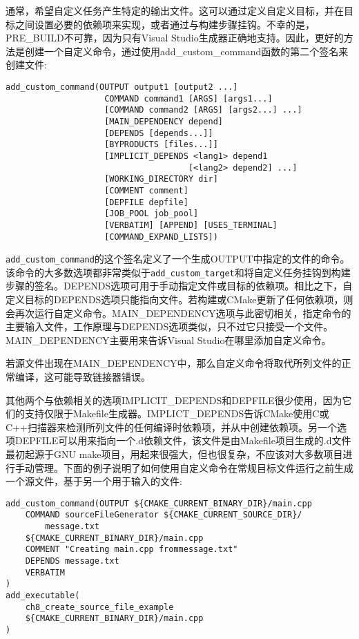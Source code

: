 通常，希望自定义任务产生特定的输出文件。这可以通过定义自定义目标，并在目标之间设置必要的依赖项来实现，或者通过与构建步骤挂钩。不幸的是，PRE\_BUILD不可靠，因为只有Visual Studio生成器正确地支持。因此，更好的方法是创建一个自定义命令，通过使用add\_custom\_command函数的第二个签名来创建文件:

\begin{lstlisting}[style=styleCMake]
add_custom_command(OUTPUT output1 [output2 ...]
					COMMAND command1 [ARGS] [args1...]
					[COMMAND command2 [ARGS] [args2...] ...]
					[MAIN_DEPENDENCY depend]
					[DEPENDS [depends...]]
					[BYPRODUCTS [files...]]
					[IMPLICIT_DEPENDS <lang1> depend1
									 [<lang2> depend2] ...]
					[WORKING_DIRECTORY dir]
					[COMMENT comment]
					[DEPFILE depfile]
					[JOB_POOL job_pool]
					[VERBATIM] [APPEND] [USES_TERMINAL]
					[COMMAND_EXPAND_LISTS])
\end{lstlisting}

\texttt{add\_custom\_command}的这个签名定义了一个生成OUTPUT中指定的文件的命令。该命令的大多数选项都非常类似于\texttt{add\_custom\_target}和将自定义任务挂钩到构建步骤的签名。DEPENDS选项可用于手动指定文件或目标的依赖项。相比之下，自定义目标的DEPENDS选项只能指向文件。若构建或CMake更新了任何依赖项，则会再次运行自定义命令。MAIN\_DEPENDENCY选项与此密切相关，指定命令的主要输入文件，工作原理与DEPENDS选项类似，只不过它只接受一个文件。MAIN\_DEPENDENCY主要用来告诉Visual Studio在哪里添加自定义命令。

\begin{tcolorbox}[colback=webgreen!5!white,colframe=webgreen!75!black,title=Note]
若源文件出现在MAIN\_DEPENDENCY中，那么自定义命令将取代所列文件的正常编译，这可能导致链接器错误。
\end{tcolorbox}

其他两个与依赖相关的选项IMPLICIT\_DEPENDS和DEPFILE很少使用，因为它们的支持仅限于Makefile生成器。IMPLICT\_DEPENDS告诉CMake使用C或C++扫描器来检测所列文件的任何编译时依赖项，并从中创建依赖项。另一个选项DEPFILE可以用来指向一个.d依赖文件，该文件是由Makefile项目生成的.d文件最初起源于GNU make项目，用起来很强大，但也很复杂，不应该对大多数项目进行手动管理。下面的例子说明了如何使用自定义命令在常规目标文件运行之前生成一个源文件，基于另一个用于输入的文件:

\begin{lstlisting}[style=styleCMake]
add_custom_command(OUTPUT ${CMAKE_CURRENT_BINARY_DIR}/main.cpp
	COMMAND sourceFileGenerator ${CMAKE_CURRENT_SOURCE_DIR}/
		message.txt
	${CMAKE_CURRENT_BINARY_DIR}/main.cpp
	COMMENT "Creating main.cpp frommessage.txt"
	DEPENDS message.txt
	VERBATIM
)
add_executable(
	ch8_create_source_file_example
	${CMAKE_CURRENT_BINARY_DIR}/main.cpp
)
\end{lstlisting}

